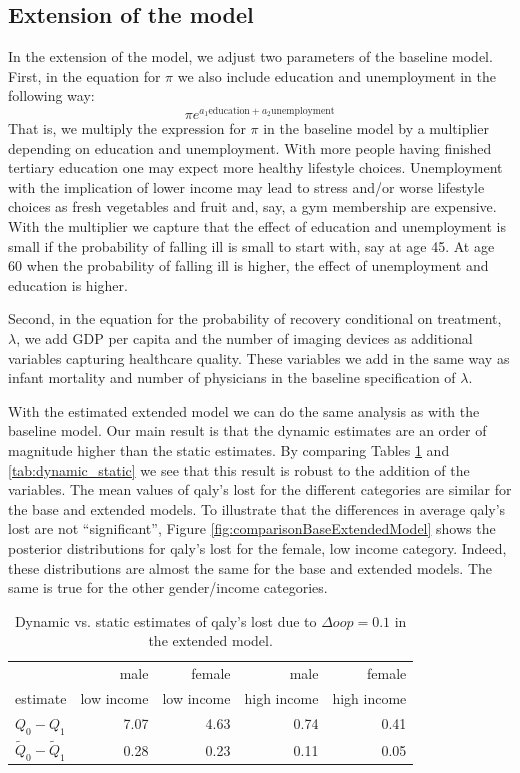 \documentclass[a4paper,12pt]{article}
\begin{document}
\subsection{Extension of the model}
\label{sec:org62b4a0a}

In the extension of the model, we adjust two parameters of the baseline model. First, in the equation for \(\pi\) we also include education and unemployment in the following way:
\begin{equation}
\pi e^{a_1 \text{education} + a_2 \text{unemployment}}
\end{equation}
That is, we multiply the expression for \(\pi\) in the baseline model by a multiplier depending on education and unemployment. With more people having finished tertiary education one may expect more healthy lifestyle choices. Unemployment with the implication of lower income may lead to stress and/or worse lifestyle choices as fresh vegetables and fruit and, say, a gym membership are expensive. With the multiplier we capture that the effect of education and unemployment is small if the probability of falling ill is small to start with, say at age 45. At age 60 when the probability of falling ill is higher, the effect of unemployment and education is higher.

Second, in the equation for the probability of recovery conditional on treatment, \(\lambda\), we add GDP per capita and the number of imaging devices as additional variables capturing healthcare quality. These variables we add in the same way as infant mortality and number of physicians in the baseline specification of \(\lambda\).

With the estimated extended model we can do the same analysis as with the baseline model. Our main result is that the dynamic estimates are an order of magnitude higher than the static estimates. By comparing Tables \ref{tab:dynamic_static_extended} and \ref{tab:dynamic_static} we see that this result is robust to the addition of the variables. The mean values of qaly's lost for the different categories are similar for the base and extended models. To illustrate that the differences in average qaly's lost are not ``significant'', Figure \ref{fig:comparisonBaseExtendedModel} shows the posterior distributions for qaly's lost for the female, low income category. Indeed, these distributions are almost the same for the base and extended models. The same is true for the other gender/income categories.

\begin{table}[htbp]
\caption{\label{tab:dynamic_static_extended}Dynamic vs. static estimates of qaly's lost due to \(\Delta oop = 0.1\) in the extended model.}
\centering
\begin{tabular}{lrrrr}
 & male & female & male & female\\
estimate & low income & low income & high income & high income\\
\hline
\(Q_0 - Q_1\) & 7.07 & 4.63 & 0.74 & 0.41\\
\(\tilde Q_0 - \tilde Q_1\) & 0.28 & 0.23 & 0.11 & 0.05\\
\end{tabular}
\end{table}
\end{document}

